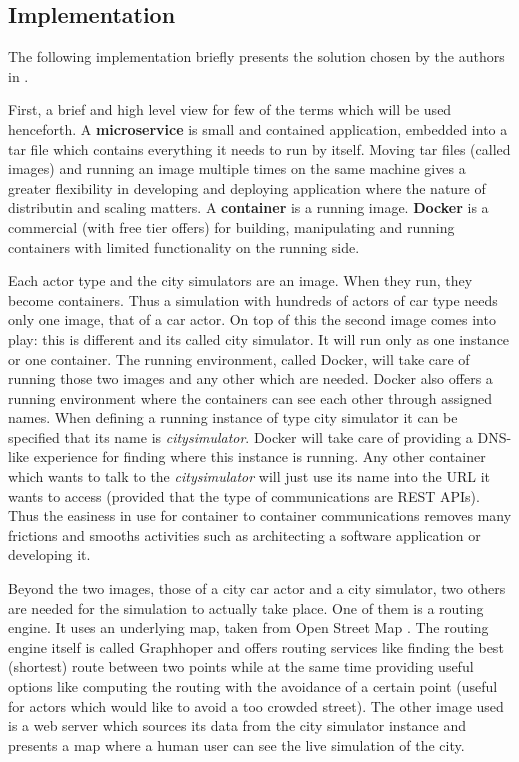 \documentclass[a4paper,12pt,twoside]{book}
\begin{document}
\subsection{Implementation}

The following implementation briefly presents the solution chosen by the authors in \cite{microservicestrafficsimulation}.

First, a brief and high level view for few of the terms which will be used henceforth. A \textbf{microservice} is small and contained application, embedded into a tar file which contains everything it needs to run by itself. Moving tar files (called images) and running an image multiple times on the same machine gives a greater flexibility in developing and deploying application where the nature of distributin and scaling matters. A \textbf{container} is a running image. \textbf{Docker} \citep{docker} is a commercial (with free tier offers) for building, manipulating and running containers with limited functionality on the running side.

Each actor type and the city simulators are an image. When they run, they become containers. Thus a simulation with hundreds of actors of car type needs only one image, that of a car actor. On top of this the second image comes into play: this is different and its called city simulator. It will run only as one instance or one container. The running environment, called Docker, will take care of running those two images and any other which are needed. Docker also offers a running environment where the containers can see each other through assigned names. When defining a running instance of type city simulator it can be specified that its name is \textit{citysimulator}. Docker will take care of providing a DNS-like experience for finding where this instance is running. Any other container which wants to talk to the \textit{citysimulator} will just use its name into the URL it wants to access (provided that the type of communications are REST APIs). Thus the easiness in use for container to container communications removes many frictions and smooths activities such as architecting a software application or developing it.

Beyond the two images, those of a city car actor and a city simulator, two others are needed for the simulation to actually take place. One of them is a routing engine. It uses an underlying map, taken from Open Street Map \citep{openstreetmap}. The routing engine itself is called Graphhoper \citep{graphhopper} and offers routing services like finding the best (shortest) route between two points while at the same time providing useful options like computing the routing with the avoidance of a certain point (useful for actors which would like to avoid a too crowded street). The other image used is a web server which sources its data from the city simulator instance and presents a map where a human user can see the live simulation of the city.
\end{document}
